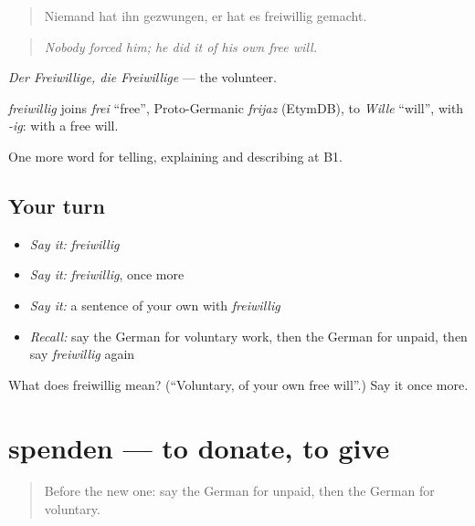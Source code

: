 \begin{quote}
Niemand hat ihn gezwungen, er hat es freiwillig gemacht.
\end{quote}

\begin{quote}
\emph{Nobody forced him; he did it of his own free will.}
\end{quote}

\emph{Der Freiwillige, die Freiwillige} — the volunteer.

\begin{cousinweb}
\emph{freiwillig} joins \emph{frei} \textquotedblleft{}free\textquotedblright{}, Proto-Germanic \emph{frijaz} (EtymDB), to \emph{Wille} \textquotedblleft{}will\textquotedblright{}, with \emph{-ig}: with a free will.
\end{cousinweb}

\begin{grammarlens}[title={What you've built}]
One more word for telling, explaining and describing at B1.
\end{grammarlens}

\subsection*{Your turn}
\begin{itemize}
\raggedright
  \item \emph{Say it:} \emph{freiwillig}
  \item \emph{Say it:} \emph{freiwillig}, once more
  \item \emph{Say it:} a sentence of your own with \emph{freiwillig}
  \item \emph{Recall:} say the German for voluntary work, then the German for unpaid, then say \emph{freiwillig} again
\end{itemize}

\begin{tcolorbox}[breakable,colback=teal!4,colframe=teal!35!black,title={Before you move on}]
What does freiwillig mean? (\textquotedblleft{}Voluntary, of your own free will\textquotedblright{}.) Say it once more.
\end{tcolorbox}
\section[spenden]{spenden — to donate, to give}

\label{lesson:GE-C362-spenden}



\begin{quote}
Before the new one: say the German for unpaid, then the German for voluntary.
\end{quote}

